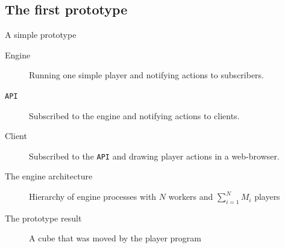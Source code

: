 \documentclass{beamer}
\begin{document}
\subsection{The first prototype}
\begin{frame}{A simple prototype}
\begin{description}
\item[Engine]
Running one simple player and notifying actions to subscribers.
\item[\texttt{API}]
Subscribed to the engine and notifying actions to clients.
\item[Client]
Subscribed to the \texttt{API} and drawing player actions in a web-browser.
\end{description}
\end{frame}
\begin{frame}{The engine architecture}
\begin{figure}[H]
\begin{center}
\noindent\resizebox{\textwidth}{!}{

}
\end{center}
\caption{Hierarchy of engine processes with $N$ workers and $\sum_{i=1}^N M_i$ players}
\label{engine_arch}
\end{figure}
\end{frame}
\begin{frame}{The prototype result}
\begin{figure}[H]
\begin{center}
\noindent{}
\end{center}
\caption{A cube that was moved by the player program}
\label{cube_movement}
\end{figure}
\end{frame}
\end{document}
